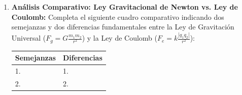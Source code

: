 \documentclass[11pt, letterpaper]{article}
\newif\ifshowanswers
\newcommand{\answer}[1]{ 
	\ifshowanswers 
	\par\vspace{0.15cm} 
	\begin{tcolorbox}[colback=blue!5!white, colframe=blue!60!white, arc=1mm, boxrule=0.5pt, title=\textbf{\footnotesize SOLUCIÓN PASO A PASO (DOCENTE)}] 
		\color{blue!80!black}\footnotesize #1 
	\end{tcolorbox} 
	\par\vspace{0.15cm} 
	\else 
	\par\vspace{0.3cm} 
	\fi 
}
\begin{document}
\begin{enumerate}[leftmargin=*, itemsep=0.8cm]
		
		\item \textbf{ Análisis Comparativo: Ley Gravitacional de Newton vs. Ley de Coulomb:} 
		Completa el siguiente cuadro comparativo indicando dos semejanzas y dos diferencias fundamentales entre la Ley de Gravitación Universal ($F_g = G \frac{m_1 m_2}{r^2}$) y la Ley de Coulomb ($F_e = k \frac{|q_1 q_2|}{r^2}$): 
		\begin{center} 
			\small 
			\begin{tabularx}{\textwidth}{|X|X|} 
				\hline 
				\rowcolor{valblue} \color{white}\textbf{Semejanzas} & \color{white}\textbf{Diferencias} \\ \hline 
				1. & 1. \\[1cm] \hline 
				2. & 2. \\[1cm] \hline 
			\end{tabularx} 
		\end{center} 
		\answer{ 
			\textbf{Semejanzas:} 
			\begin{enumerate} 
				\item Ambas son fuerzas centrales de acción a distancia que disminuyen inversamente con el cuadrado de la distancia ($F \propto \frac{1}{r^2}$). 
				\item Ambas dependen del producto de propiedades intrínsecas fundamentales de la materia (masas $m_1, m_2$ en gravitacional y cargas $q_1, q_2$ en electrostática). 
			\end{enumerate} 
			\textbf{Diferencias:} 
			\begin{enumerate} 
				\item La fuerza gravitacional es exclusivamente de atracción, mientras que la fuerza electrostática puede ser tanto de atracción (signos opuestos) como de repulsión (mismo signo). 
				\item La constante electrostática ($k \approx 9 \times 10^9\text{ N}\cdot\text{m}^2/\text{C}^2$) es inmensamente mayor que la constante gravitacional ($G \approx 6,67 \times 10^{-11}\text{ N}\cdot\text{m}^2/\text{kg}^2$), haciendo que la interacción electrostática sea órdenes de magnitud más intensa a nivel atómico. 
			\end{enumerate} 
		} 
		

\end{enumerate}
\end{document}
